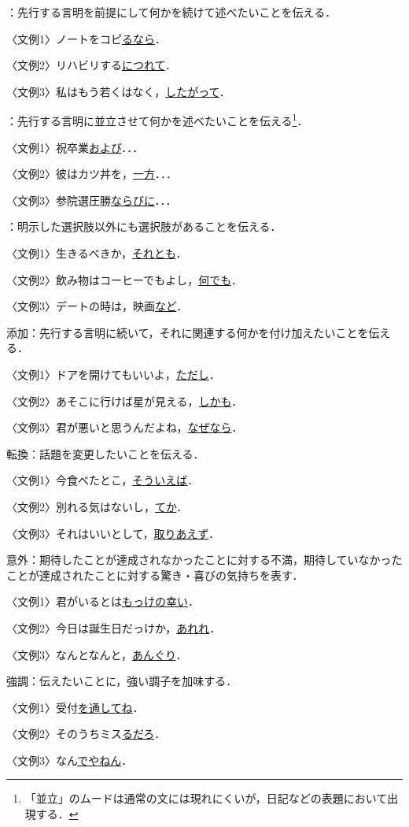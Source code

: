 \documentclass[japanese]{jnlp_1.4}
\newcommand{\InH}[1]{}
\begin{document}
\InH{(16)}
：先行する言明を前提にして何かを続けて述べたいことを伝える．

〈文例1〉ノートをコピ\ul{るなら}．

〈文例2〉リハビリする\ul{につれて}．

〈文例3〉私はもう若くはなく，\ul{したがって}．

\InH{(17)}
：先行する言明に並立させて何かを述べたいことを伝える\footnote{
	「並立」のムードは通常の文には現れにくいが，日記などの表題において出現する．}．

〈文例1〉祝卒業\ul{および}．．．

〈文例2〉彼はカツ丼を，\ul{一方}．．．

〈文例3〉参院選圧勝\ul{ならびに}．．．

\InH{(18)}
：明示した選択肢以外にも選択肢があることを伝える．

〈文例1〉生きるべきか，\ul{それとも}．

〈文例2〉飲み物はコーヒーでもよし，\ul{何でも}．

〈文例3〉デートの時は，映画\ul{など}．

\InH{(19)}
添加：先行する言明に続いて，それに関連する何かを付け加えたいことを伝える．

〈文例1〉ドアを開けてもいいよ，\ul{ただし}．

〈文例2〉あそこに行けば星が見える，\ul{しかも}．

〈文例3〉君が悪いと思うんだよね，\ul{なぜなら}．

\InH{(20)}
転換：話題を変更したいことを伝える．

〈文例1〉今食べたとこ，\ul{そういえば}．

〈文例2〉別れる気はないし，\ul{てか}．

〈文例3〉それはいいとして，\ul{取りあえず}．

\InH{(21)}
意外：期待したことが達成されなかったことに対する不満，期待していなかったことが達成されたことに対する驚き・喜びの気持ちを表す．

〈文例1〉君がいるとは\ul{もっけの幸い}．

〈文例2〉今日は誕生日だっけか，\ul{あれれ}．

〈文例3〉なんとなんと，\ul{あんぐり}．

\InH{(22)}
強調：伝えたいことに，強い調子を加味する．

〈文例1〉受付\ul{を通してね}．

〈文例2〉そのうちミス\ul{るだろ}．

〈文例3〉なん\ul{でやねん}．
\end{document}
